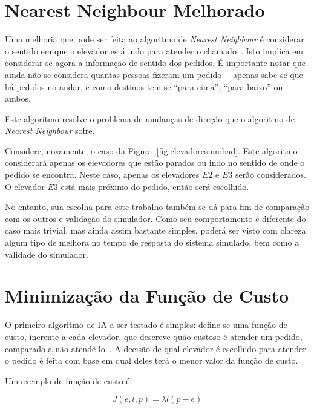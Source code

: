 \section{\label{sec:ai:nnm}Nearest Neighbour Melhorado}

Uma melhoria que pode ser feita ao algoritmo de \textit{Nearest Neighbour}
é considerar o sentido em que o elevador está indo para atender o
chamado~\cite{Friese20061908}. Isto implica em considerar-se agora
a informação de sentido dos pedidos. É importante notar que ainda não se
considera quantas pessoas fizeram um pedido~-~apenas sabe-se que há pedidos no
andar, e como destinos tem-se ``para cima'', ``para baixo'' ou ambos.

Este algoritmo resolve o problema de mudanças de direção que o algoritmo de
\textit{Nearest Neighbour} sofre.

Considere, novamente, o caso da Figura~\ref{fig:elevadores:nn:bad}. Este
algoritmo considerará apenas os elevadores que estão parados ou indo no sentido
de onde o pedido se encontra. Neste caso, apenas os elevadores $E2$ e $E3$ serão
considerados. O elevador $E3$ está mais próximo do pedido, então será escolhido.

No entanto, sua escolha para este trabalho também se dá para fim de comparação
com os outros e validação do simulador. Como seu comportamento é diferente do
caso mais trivial, mas ainda assim bastante simples, poderá ser visto com clareza
algum tipo de melhora no tempo de resposta do sistema simulado, bem como a validade do simulador.

\section{\label{sec:ai:minimize-cost-function}Minimização da Função de Custo}

O primeiro algoritmo de IA a ser testado é simples: define-se uma
função de custo, inerente a cada elevador, que descreve quão custoso
é atender um pedido, comparado a não atendê-lo~\cite{Friese20061908}.
A decisão de qual elevador é escolhido para atender o pedido é feita com base
em qual deles terá o menor valor da função de custo.

Um exemplo de função de custo é:

\[
  J(e, l, p) = \lambda l(p - e)
\]

